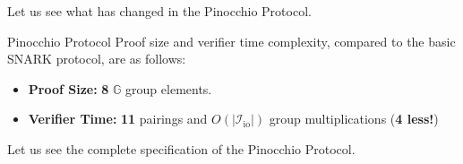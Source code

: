 \documentclass[../lecture-notes-148x210.tex]{subfiles}
\begin{document}
Let us see what has changed in the Pinocchio Protocol.

\begin{proposition}{Pinocchio Protocol}
    Proof size and verifier time complexity, compared to the basic SNARK protocol, are as follows:
    \begin{itemize}
        \item \textbf{Proof Size:} \textbf{8} $\mathbb{G}$ group elements.
        \item \textbf{Verifier Time:} \textbf{11} pairings and $O(|\mathcal{I}_{\text{io}}|)$ group multiplications (\textbf{4 less!})
    \end{itemize}
\end{proposition}

Let us see the complete specification of the Pinocchio Protocol.
\end{document}
